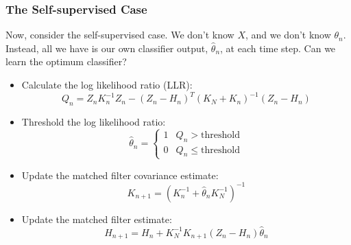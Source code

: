 \documentclass{beamer}
\begin{document}
\begin{frame}
  \frametitle{The Self-supervised Case}

  Now, consider the self-supervised case.  We don't know $X$, and we
  don't know $\theta_n$.  Instead, all we have is our own classifier
  output, $\hat\theta_n$, at each time step.  Can we learn the optimum classifier?
  \begin{itemize}
  \item Calculate the log likelihood ratio (LLR):
    \begin{displaymath}
      Q_n = Z_nK_n^{-1}Z_n -
      (Z_n-H_n)^T(K_N+K_n)^{-1}(Z_n-H_n)
    \end{displaymath}
  \item Threshold the log likelihood ratio:
    \begin{displaymath}
      \hat\theta_n = \left\{\begin{array}{ll}
      1 & Q_n > \text{threshold}\\
      0 & Q_n \le \text{threshold}
      \end{array}\right.
    \end{displaymath}
  \item Update the matched filter covariance estimate:
    \begin{displaymath}
      K_{n+1} = \left(K_n^{-1}+\hat\theta_n K_N^{-1}\right)^{-1}
    \end{displaymath}
  \item Update the matched filter estimate:
    \begin{displaymath}
      H_{n+1} = H_n + K_N^{-1}K_{n+1}(Z_n-H_n)\hat\theta_n
    \end{displaymath}
  \end{itemize}
\end{frame}
\end{document}
